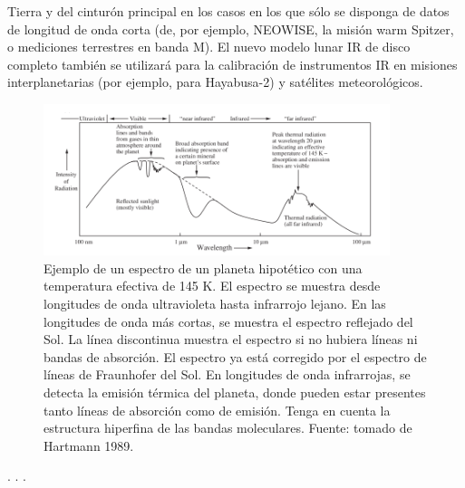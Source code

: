\documentclass[12pt]{article}
\begin{document}
Tierra y del cinturón principal en los casos en los que sólo se disponga de datos de longitud 
de onda corta (de, por ejemplo, NEOWISE, la misión warm Spitzer, o mediciones terrestres en 
banda M). El nuevo modelo lunar IR de disco completo también se utilizará para la calibración 
de instrumentos IR en misiones interplanetarias (por ejemplo, para Hayabusa-2) y satélites 
meteorológicos.
\begin{figure}[H]
    \centering
    \includegraphics[width=0.9\textwidth]{images/Emision_moon_example.png}
    \caption{Ejemplo de un espectro de un planeta hipotético con una temperatura efectiva de 145 K. 
    El espectro se muestra desde longitudes de onda ultravioleta hasta infrarrojo lejano. 
    En las longitudes de onda más cortas, se muestra el espectro reflejado del Sol. La línea 
    discontinua muestra el espectro si no hubiera líneas ni bandas de absorción. El espectro ya 
    está corregido por el espectro de líneas de Fraunhofer del Sol. En longitudes de onda infrarrojas, 
    se detecta la emisión térmica del planeta, donde pueden estar presentes tanto líneas de absorción 
    como de emisión. Tenga en cuenta la estructura hiperfina de las bandas moleculares.
    Fuente: tomado de Hartmann 1989.}
    \label{fig:ejemplo_emision_luna}
\end{figure}

.
.
.
\end{document}

